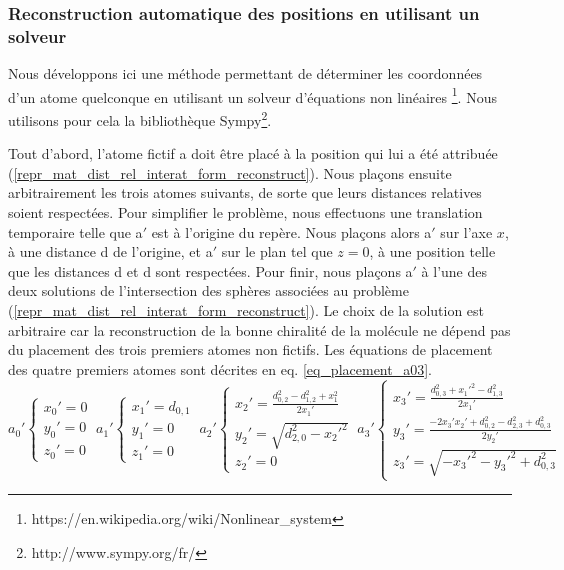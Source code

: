 \subsubsection{Reconstruction automatique des positions en utilisant un solveur}

\par Nous développons ici une méthode permettant de déterminer les coordonnées d'un atome quelconque en utilisant un solveur d'équations non linéaires \footnote{https://en.wikipedia.org/wiki/Nonlinear\_system}. Nous utilisons pour cela la bibliothèque Sympy\footnote{http://www.sympy.org/fr/}.\\

\par Tout d'abord, l'atome fictif a doit être placé à la position qui lui a été attribuée (\ref{repr_mat_dist_rel_interat_form_reconstruct}). Nous plaçons ensuite arbitrairement les trois atomes suivants, de sorte que leurs distances relatives soient respectées. Pour simplifier le problème, nous effectuons une translation temporaire telle que a$'$ est à l'origine du repère. Nous plaçons alors a$'$ sur l'axe $x$, à une distance d de l'origine, et a$'$ sur le plan tel que $z=0$, à une position telle que les distances d et d sont respectées. Pour finir, nous plaçons a$'$ à l'une des deux solutions de l'intersection des sphères associées au problème (\ref{repr_mat_dist_rel_interat_form_reconstruct}). Le choix de la solution est arbitraire car la reconstruction de la bonne chiralité de la molécule ne dépend pas du placement des trois premiers atomes non fictifs. Les équations de placement des quatre premiers atomes sont décrites en eq. \eqref{eq_placement_a03}. \\
\begin{equation}
	a_{0}'\left \{
   	\begin{array}{l}
      x_{0}'=0\\
      y_{0}'=0\\
	  z_{0}'=0
   	\end{array}
   	\right .
   	\:
   	a_{1}'\left \{
   	\begin{array}{l}
      x_{1}'=d_{0,1}\\
      y_{1}'=0\\
	  z_{1}'=0
   	\end{array}
   	\right .
   	\:
	a_{2}'\left \{
   	\begin{array}{l}
      x_{2}'=\frac{d_{0,2}^2 - d_{1,2}^2 + x_{1}^2}{2x_{1}'}\\
      y_{2}'=\sqrt{d_{2,0}^2 - x_{2}'^2}\\
	  z_{2}'=0
   	\end{array}
   	\right .
   	\:
   	a_{3}'\left \{
   	\begin{array}{l}
      x_{3}'=\frac{d_{0,3}^2+x_1'^2-d_{1,3}^2}{2x_{1}'}\\
      y_{3}'=\frac{-2x_3'x_2'+d_{0,2}^2-d_{2,3}^2+d_{0,3}^2}{2y_2'}\\
	  z_{3}'=\sqrt{-x_3'^2-y_3'^2+d_{0,3}^2}
   	\end{array}
   	\right .
	\label{eq_placement_a03}
\end{equation}


